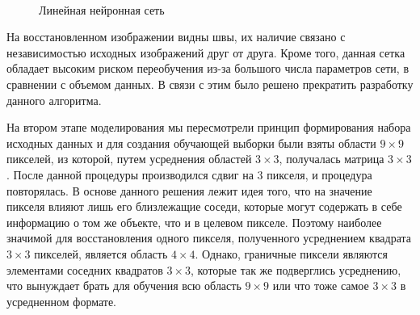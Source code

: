 \documentclass[12pt,twoside]{article}
\begin{document}
\begin{figure}[h]
	\centering
	\\
	\caption{Линейная нейронная сеть}
	\label{fig:linear}
\end{figure}



	На восстановленном изображении видны швы, их наличие связано с независимостью исходных изображений друг от друга. Кроме того, данная сетка обладает высоким риском переобучения из-за большого числа параметров сети, в сравнении с объемом данных. В связи с этим было решено прекратить разработку данного алгоритма.
	
	На втором этапе моделирования мы пересмотрели принцип формирования набора исходных данных и для создания обучающей выборки были взяты области $9 \times 9$ пикселей, из которой, путем усреднения областей $3 \times 3$, получалась матрица $3 \times 3$.  После данной процедуры производился сдвиг на 3 пикселя, и процедура повторялась. В основе данного решения лежит идея того, что на значение пикселя влияют лишь его близлежащие соседи, которые могут содержать в себе информацию о том же объекте, что и в целевом пикселе. Поэтому наиболее значимой для восстановления одного пикселя, полученного усреднением квадрата $3 \times 3$ пикселей, является область $4 \times 4$. Однако, граничные пиксели являются элементами соседних квадратов $3 \times 3$, которые так же подверглись усреднению, что вынуждает брать для обучения всю область $9 \times 9$ или что тоже самое $3 \times 3$ в усредненном формате.
	
\end{document}
